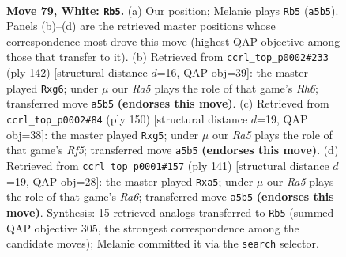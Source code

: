 \documentclass[11pt]{article}
\begin{document}
\clearpage

\begin{figure}[p]\centering
\begin{subfigure}{0.46\textwidth}\centering
\resizebox{\linewidth}{!}{%
\newchessgame
\chessboard[
  setfen={2k5/8/7n/R7/p6r/P6p/7K/8 w - - 16 79},
  showmover=false,
  pgfstyle=straightmove, color=movearrow, markmove={a5-b5}
]}
\caption{}
\end{subfigure}\hfill
\begin{subfigure}{0.46\textwidth}\centering
\resizebox{\linewidth}{!}{%
\newchessgame
\chessboard[
  setfen={8/8/6pR/8/3r1k1P/3p4/3K4/8 w - - 2 72},
  showmover=false,
  pgfstyle=straightmove, color=movearrow, markmove={h6-g6}
]}
\caption{}
\end{subfigure}
\\[4pt]
\begin{subfigure}{0.46\textwidth}\centering
\resizebox{\linewidth}{!}{%
\newchessgame
\chessboard[
  setfen={8/4k3/2r5/5Rp1/6P1/8/2p5/2K5 w - - 0 76},
  showmover=false,
  pgfstyle=straightmove, color=movearrow, markmove={f5-g5}
]}
\caption{}
\end{subfigure}\hfill
\begin{subfigure}{0.46\textwidth}\centering
\resizebox{\linewidth}{!}{%
\newchessgame
\chessboard[
  setfen={8/8/8/P1k5/2P3R1/r7/6K1/8 b - - 0 71},
  showmover=false,
  pgfstyle=straightmove, color=movearrow, markmove={a3-a5}
]}
\caption{}
\end{subfigure}
\caption{\textbf{Move 79, White: \texttt{Rb5}.} (a) Our position; Melanie plays \texttt{Rb5} (\texttt{a5b5}). Panels (b)--(d) are the retrieved master positions whose correspondence most drove this move (highest QAP objective among those that transfer to it). (b) Retrieved from \texttt{ccrl\_top\_p0002\#233} (ply 142) [structural distance $d$=16, QAP obj=39]: the master played \texttt{Rxg6}; under $\mu$ our \emph{Ra5} plays the role of that game's \emph{Rh6}; transferred move \texttt{a5b5} \textbf{(endorses this move)}. (c) Retrieved from \texttt{ccrl\_top\_p0002\#84} (ply 150) [structural distance $d$=19, QAP obj=38]: the master played \texttt{Rxg5}; under $\mu$ our \emph{Ra5} plays the role of that game's \emph{Rf5}; transferred move \texttt{a5b5} \textbf{(endorses this move)}. (d) Retrieved from \texttt{ccrl\_top\_p0001\#157} (ply 141) [structural distance $d$=19, QAP obj=28]: the master played \texttt{Rxa5}; under $\mu$ our \emph{Ra5} plays the role of that game's \emph{Ra6}; transferred move \texttt{a5b5} \textbf{(endorses this move)}. Synthesis: 15 retrieved analogs transferred to \texttt{Rb5} (summed QAP objective 305, the strongest correspondence among the candidate moves); Melanie committed it via the \texttt{search} selector.}
\label{fig:thought-m156}
\end{figure}
\end{document}
